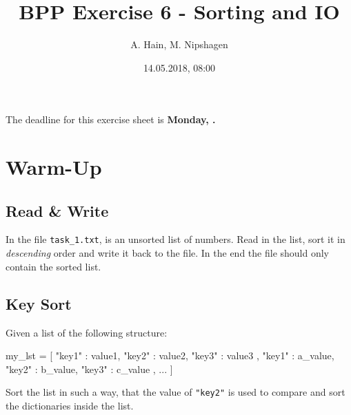 
\usepackage{tikz}
\usetikzlibrary{arrows,automata}

\title{BPP Exercise 6 - Sorting and IO}
\author{A. Hain, M. Nipshagen}
\date{14.05.2018, 08:00}

\makeatletter
\let\thetitle\@title
\let\theauthor\@author
\let\thedate\@date
\makeatother





The deadline for this exercise sheet is \textbf{Monday, \thedate.}
%
%

\section{Warm-Up}
\subsection{Read \& Write}
In the file \texttt{task\_1.txt}, is an unsorted list of numbers. Read in the list, sort it in \textit{descending} order and write it back to the file.
In the end the file should only contain the sorted list.\\
\cprotect{}

\subsection{Key Sort}
Given a list of the following structure:
\begin{python}
my_lst = [
  {
    "key1" : value1,
    "key2" : value2,
    "key3" : value3
  },
  {
    "key1" : a_value,
    "key2" : b_value,
    "key3" : c_value
  },
  ...
]
\end{python}
Sort the list in such a way, that the value of \texttt{"key2"} is used to compare and sort the dictionaries inside the list.\\
\cprotect{}

